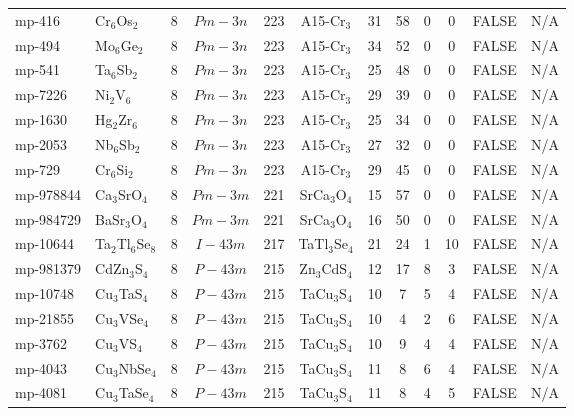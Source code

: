 {\begin{longtable}{llcccccccccc}
    mp-416 & Cr$_{6}$Os$_{2}$ & 8     & $Pm-3n$ & 223   & A15-Cr$_{3}$ & 31    & 58    & 0     & 0     & FALSE & N/A \\
    mp-494 & Mo$_{6}$Ge$_{2}$ & 8     & $Pm-3n$ & 223   & A15-Cr$_{3}$ & 34    & 52    & 0     & 0     & FALSE & N/A \\
    mp-541 & Ta$_{6}$Sb$_{2}$ & 8     & $Pm-3n$ & 223   & A15-Cr$_{3}$ & 25    & 48    & 0     & 0     & FALSE & N/A \\
    mp-7226 & Ni$_{2}$V$_{6}$ & 8     & $Pm-3n$ & 223   & A15-Cr$_{3}$ & 29    & 39    & 0     & 0     & FALSE & N/A \\
    mp-1630 & Hg$_{2}$Zr$_{6}$ & 8     & $Pm-3n$ & 223   & A15-Cr$_{3}$ & 25    & 34    & 0     & 0     & FALSE & N/A \\
    mp-2053 & Nb$_{6}$Sb$_{2}$ & 8     & $Pm-3n$ & 223   & A15-Cr$_{3}$ & 27    & 32    & 0     & 0     & FALSE & N/A \\
    mp-729 & Cr$_{6}$Si$_{2}$ & 8     & $Pm-3n$ & 223   & A15-Cr$_{3}$ & 29    & 45    & 0     & 0     & FALSE & N/A \\
    mp-978844 & Ca$_{3}$SrO$_{4}$ & 8     & $Pm-3m$ & 221   & SrCa$_{3}$O$_{4}$ & 15    & 57    & 0     & 0     & FALSE & N/A \\
    mp-984729 & BaSr$_{3}$O$_{4}$ & 8     & $Pm-3m$ & 221   & SrCa$_{3}$O$_{4}$ & 16    & 50    & 0     & 0     & FALSE & N/A \\
    mp-10644 & Ta$_{2}$Tl$_{6}$Se$_{8}$ & 8     & $I-43m$ & 217   & TaTl$_{3}$Se$_{4}$ & 21    & 24    & 1     & 10    & FALSE & N/A \\
    mp-981379 & CdZn$_{3}$S$_{4}$ & 8     & $P-43m$ & 215   & Zn$_{3}$CdS$_{4}$ & 12    & 17    & 8     & 3     & FALSE & N/A \\
    mp-10748 & Cu$_{3}$TaS$_{4}$ & 8     & $P-43m$ & 215   & TaCu$_{3}$S$_{4}$ & 10    & 7     & 5     & 4     & FALSE & N/A \\
    mp-21855 & Cu$_{3}$VSe$_{4}$ & 8     & $P-43m$ & 215   & TaCu$_{3}$S$_{4}$ & 10    & 4     & 2     & 6     & FALSE & N/A \\
    mp-3762 & Cu$_{3}$VS$_{4}$ & 8     & $P-43m$ & 215   & TaCu$_{3}$S$_{4}$ & 10    & 9     & 4     & 4     & FALSE & N/A \\
    mp-4043 & Cu$_{3}$NbSe$_{4}$ & 8     & $P-43m$ & 215   & TaCu$_{3}$S$_{4}$ & 11    & 8     & 6     & 4     & FALSE & N/A \\
    mp-4081 & Cu$_{3}$TaSe$_{4}$ & 8     & $P-43m$ & 215   & TaCu$_{3}$S$_{4}$ & 11    & 8     & 4     & 5     & FALSE & N/A \\

\end{longtable}}
